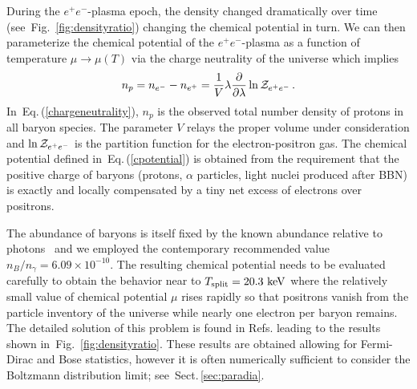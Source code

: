 \documentclass[aps,prd,floatfix,reprint]{revtex4-2}
\newcommand*{\keV}{\text{ keV}}
\newcommand{\req}[1]{Eq.\,(\ref{#1})}
\newcommand{\rf}[1]{Fig.~{\ref{#1}}}
\newcommand{\rsec}[1]{Sect.\,{\ref{#1}}}
\begin{document}
During the $e^{+}e^{-}$-plasma epoch, the density changed dramatically over time (see~\rf{fig:densityratio}) changing the chemical potential in turn. We can then parameterize the chemical potential of the $e^{+}e^{-}$-plasma as a function of temperature $\mu\rightarrow\mu(T)$ via the charge neutrality of the universe which implies
\begin{align}
 \label{chargeneutrality}
 n_{p}=n_{e^{-}}-n_{e^{+}}=\frac{1}{V}\lambda\frac{\partial}{\partial\lambda}\ln{\cal Z}_{e^{+}e^{-}}\,.
\end{align}
In~\req{chargeneutrality}, $n_{p}$ is the observed total number density of protons in all baryon species. The parameter $V$ relays the proper volume under consideration and $\ln{\cal Z}_{e^{+}e^{-}}$ is the partition function for the electron-positron gas. The chemical potential defined in~\req{cpotential} is obtained from the requirement that the positive charge of baryons (protons, $\alpha$ particles, light nuclei produced after BBN) is exactly and locally compensated by a tiny net excess of electrons over positrons.

The abundance of baryons is itself fixed by the known abundance relative to photons~\cite{ParticleDataGroup:2022pth} and we employed the contemporary recommended value $n_B/n_\gamma=6.09\times 10^{-10}$. The resulting chemical potential needs to be evaluated carefully to obtain the behavior near to $T_{\rm split}=20.3\keV$ where the relatively small value of chemical potential $\mu$ rises rapidly so that positrons vanish from the particle inventory of the universe while nearly one electron per baryon remains. The detailed solution of this problem is found in Refs.\;\cite{Fromerth:2012fe,Rafelski:2023emw} leading to the results shown in~\rf{fig:densityratio}. These results are obtained allowing for Fermi-Dirac and Bose statistics, however it is often numerically sufficient to consider the Boltzmann distribution limit; see~\rsec{sec:paradia}.
\end{document}
